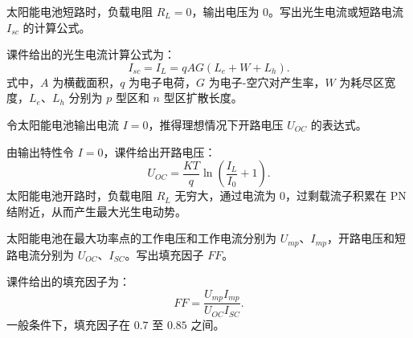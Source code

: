 \begin{problem}[光生电流]\label{exer:calc_04_solar_p122_01}
太阳能电池短路时，负载电阻 \(R_L=0\)，输出电压为 \(0\)。写出光生电流或短路电流 \(I_{sc}\) 的计算公式。
\end{problem}

\begin{solution}
课件给出的光生电流计算公式为：
\begin{equation}
I_{sc} = I_L = qAG(L_e + W + L_h).
\end{equation}
式中，\(A\) 为横截面积，\(q\) 为电子电荷，\(G\) 为电子-空穴对产生率，\(W\) 为耗尽区宽度，\(L_e\)、\(L_h\) 分别为 \(p\) 型区和 \(n\) 型区扩散长度。
\end{solution}

\begin{problem}[开路电压]\label{exer:calc_04_solar_p123_01}
令太阳能电池输出电流 \(I = 0\)，推得理想情况下开路电压 \(U_{OC}\) 的表达式。
\end{problem}

\begin{solution}
由输出特性令 \(I = 0\)，课件给出开路电压：
\begin{equation}
U_{OC}
= \frac{KT}{q}\ln\left(\frac{I_L}{I_0}+1\right).
\end{equation}
太阳能电池开路时，负载电阻 \(R_L\) 无穷大，通过电流为 \(0\)，过剩载流子积累在 PN 结附近，从而产生最大光生电动势。
\end{solution}

\begin{problem}[填充因子定义]\label{exer:calc_04_solar_p125_01}
太阳能电池在最大功率点的工作电压和工作电流分别为 \(U_{mp}\)、\(I_{mp}\)，开路电压和短路电流分别为 \(U_{OC}\)、\(I_{SC}\)。写出填充因子 \(FF\)。
\end{problem}

\begin{solution}
课件给出的填充因子为：
\begin{equation}
FF = \frac{U_{mp}I_{mp}}{U_{OC}I_{SC}}.
\end{equation}
一般条件下，填充因子在 \(0.7\) 至 \(0.85\) 之间。
\end{solution}

